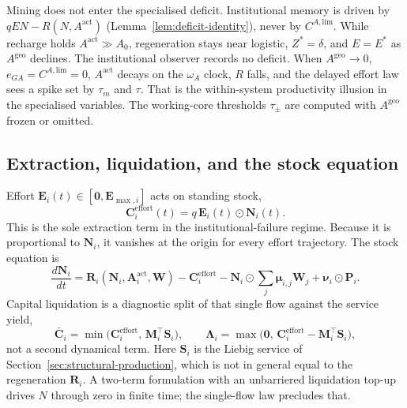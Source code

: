 \documentclass[11pt]{article}
\theoremstyle{definition}
\begin{document}
Mining does not enter the specialised deficit. Institutional memory is driven by $qEN-R(N,A^{\mathrm{act}})$ (Lemma~\ref{lem:deficit-identity}), never by $C^{A,\mathrm{lim}}$. While recharge holds $A^{\mathrm{act}}\gg A_0$, regeneration stays near logistic, $Z^*=\delta$, and $E=E^*$ as $A^{\mathrm{geo}}$ declines. The institutional observer records no deficit. When $A^{\mathrm{geo}}\to 0$, $e_{GA}=C^{A,\mathrm{lim}}=0$, $A^{\mathrm{act}}$ decays on the $\omega_A$ clock, $R$ falls, and the delayed effort law sees a spike set by $\tau_m$ and $\tau$. That is the within-system productivity illusion in the specialised variables. The working-core thresholds $\tau_\pm$ are computed with $A^{\mathrm{geo}}$ frozen or omitted.

\subsection{Extraction, liquidation, and the stock equation}

Effort $\mathbf E_i(t)\in[\mathbf 0,\mathbf E_{\max,i}]$ acts on standing stock,
\begin{equation}
\mathbf C_i^{\mathrm{effort}}(t)=q\,\mathbf E_i(t)\odot\mathbf N_i(t).
\end{equation}
This is the sole extraction term in the institutional-failure regime. Because it is proportional to $\mathbf N_i$, it vanishes at the origin for every effort trajectory. The stock equation is
\begin{equation}
\frac{d\mathbf N_i}{dt}
= \mathbf R_i(\mathbf N_i,\mathbf A^{\mathrm{act}}_i,\mathbf W)
- \mathbf C_i^{\mathrm{effort}}
- \mathbf N_i\odot\sum_j\boldsymbol\mu_{i,j}\mathbf W_j
+ \boldsymbol\nu_i\odot\mathbf P_i.
\label{eq:nvec}
\end{equation}
Capital liquidation is a diagnostic split of that single flow against the service yield,
\begin{equation}
\bar{\mathbf C}_i=\min\bigl(\mathbf C_i^{\mathrm{effort}},\,\mathbf M_i^\top\mathbf S_i\bigr),\qquad
\boldsymbol\Lambda_i=\max\bigl(\mathbf 0,\,\mathbf C_i^{\mathrm{effort}}-\mathbf M_i^\top\mathbf S_i\bigr),
\label{eq:liquidation-general}
\end{equation}
not a second dynamical term. Here $\mathbf S_i$ is the Liebig service of Section~\ref{sec:structural-production}, which is not in general equal to the regeneration $\mathbf R_i$. A two-term formulation with an unbarriered liquidation top-up drives $N$ through zero in finite time; the single-flow law precludes that.
\end{document}
